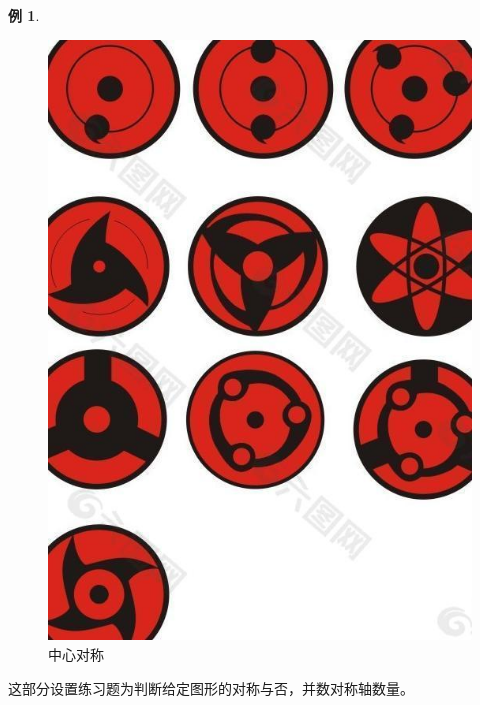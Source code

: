 \documentclass{article}
\theoremstyle{definition}
\newtheorem{example}{例}
\theoremstyle{remark}
\theoremstyle{theorem}
\begin{document}
\begin{example}
\begin{figure}
    \centering
    \includegraphics[scale=0.3]{eye.jpg}
    \caption{中心对称}
    \label{eye}
\end{figure}
\end{example}
这部分设置练习题为判断给定图形的对称与否，并数对称轴数量。
\end{document}
